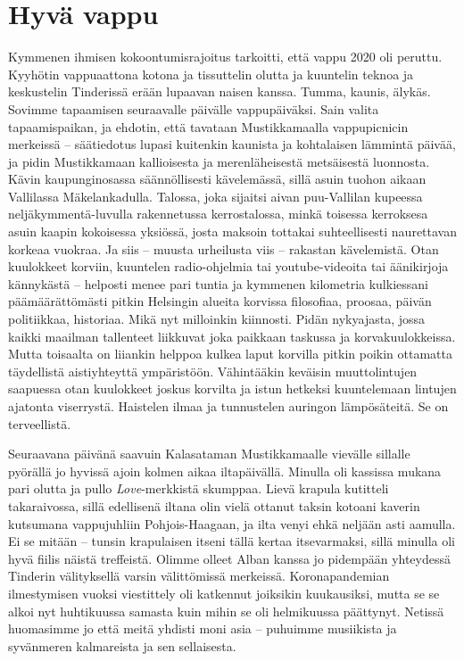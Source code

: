 \documentclass{tsnovel}
\begin{document}
\section{Hyvä vappu}

Kymmenen ihmisen kokoontumisrajoitus tarkoitti, että vappu 2020 oli peruttu. Kyyhötin vappuaattona kotona ja tissuttelin olutta ja kuuntelin teknoa ja keskustelin Tinderissä erään lupaavan naisen kanssa. Tumma, kaunis, älykäs. Sovimme tapaamisen seuraavalle päivälle vappupäiväksi. Sain valita tapaamispaikan, ja ehdotin, että tavataan Mustikkamaalla vappupicnicin merkeissä – säätiedotus lupasi kuitenkin kaunista ja kohtalaisen lämmintä päivää, ja pidin Mustikkamaan kallioisesta ja merenläheisestä metsäisestä luonnosta. Kävin kaupunginosassa säännöllisesti kävelemässä, sillä asuin tuohon aikaan Vallilassa Mäkelankadulla. Talossa, joka sijaitsi aivan puu-Vallilan kupeessa neljäkymmentä-luvulla rakennetussa kerrostalossa, minkä toisessa kerroksesa asuin kaapin kokoisessa yksiössä, josta maksoin tottakai suhteellisesti naurettavan korkeaa vuokraa. Ja siis – muusta urheilusta viis – rakastan kävelemistä. Otan kuulokkeet korviin, kuuntelen radio-ohjelmia tai youtube-videoita tai äänikirjoja kännykästä – helposti menee pari tuntia ja kymmenen kilometria kulkiessani päämäärättömästi pitkin Helsingin alueita korvissa  filosofiaa, proosaa, päivän politiikkaa, historiaa. Mikä nyt milloinkin kiinnosti. Pidän nykyajasta, jossa kaikki maailman tallenteet liikkuvat joka paikkaan taskussa ja korvakuulokkeissa. Mutta toisaalta on liiankin helppoa kulkea laput korvilla pitkin poikin ottamatta täydellistä aistiyhteyttä ympäristöön. Vähintääkin keväisin muuttolintujen saapuessa otan kuulokkeet joskus korvilta ja istun hetkeksi kuuntelemaan lintujen ajatonta viserrystä. Haistelen ilmaa ja tunnustelen auringon lämpösäteitä. Se on terveellistä.

Seuraavana päivänä saavuin Kalasataman Mustikkamaalle vievälle sillalle pyörällä jo hyvissä ajoin kolmen aikaa iltapäivällä. Minulla oli kassissa mukana pari olutta ja pullo \textit{Love}-merkkistä skumppaa. Lievä krapula kutitteli takaraivossa, sillä edellisenä iltana olin vielä ottanut taksin kotoani kaverin kutsumana vappujuhliin Pohjois-Haagaan, ja ilta venyi ehkä neljään asti aamulla. Ei se mitään – tunsin krapulaisen itseni tällä kertaa itsevarmaksi, sillä minulla oli hyvä fiilis näistä treffeistä. Olimme olleet Alban kanssa jo pidempään yhteydessä Tinderin välityksellä varsin välittömissä merkeissä. Koronapandemian ilmestymisen vuoksi viestittely oli katkennut joiksikin kuukausiksi, mutta se se alkoi nyt huhtikuussa samasta kuin mihin se oli helmikuussa päättynyt. Netissä huomasimme jo että meitä yhdisti moni asia – puhuimme musiikista ja syvänmeren kalmareista ja sen sellaisesta.
\end{document}
